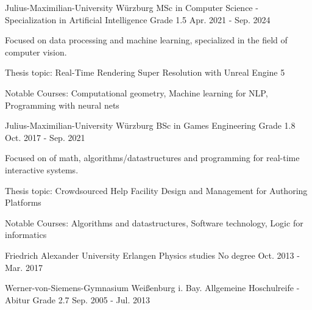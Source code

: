 

\begin{cventries}

  \cventry
    {Julius-Maximilian-University Würzburg} %
    {MSc in Computer Science - Specialization in Artificial Intelligence} %
    {Grade 1.5} %
    {Apr. 2021 - Sep. 2024} %
    {
      \begin{cvitems} %
        \item {Focused on data processing and machine learning, specialized in the field of computer vision.}
        \item {Thesis topic: Real-Time Rendering Super Resolution with Unreal Engine 5}
        \item {Notable Courses: Computational geometry, Machine learning for NLP, Programming with neural nets}
      \end{cvitems}
    }

  \cventry
    {Julius-Maximilian-University Würzburg} %
    {BSc in Games Engineering} %
    {Grade 1.8} %
    {Oct. 2017 - Sep. 2021} %
    {
      \begin{cvitems} %
        \item {Focused on of math, algorithms/datastructures and programming for real-time interactive systems.}
        \item {Thesis topic: Crowdsourced Help Facility Design and Management for Authoring Platforms}
        \item {Notable Courses: Algorithms and datastructures, Software technology, Logic for informatics}
      \end{cvitems}
    }

\cventry
{Friedrich Alexander University Erlangen} %
{Physics studies} %
{No degree} %
{Oct. 2013 - Mar. 2017} %
{}

\cventry
{Werner-von-Siemens-Gymnasium Weißenburg i. Bay.} %
{Allgemeine Hoschulreife - Abitur} %
{Grade 2.7} %
{Sep. 2005 - Jul. 2013} %
{}

\end{cventries}
